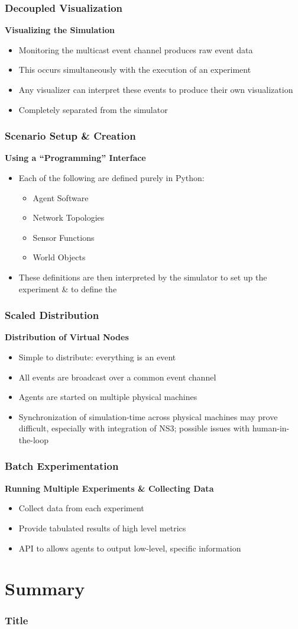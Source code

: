 \documentclass[mathserif]{beamer}
\begin{document}
\frame
{
    \frametitle{Decoupled Visualization}
    \textbf{Visualizing the Simulation}
    \begin{itemize}
        \item Monitoring the multicast event channel produces raw event data
        \item This occurs simultaneously with the execution of an experiment
        \item Any visualizer can interpret these events to produce their own visualization
        \item Completely separated from the simulator
    \end{itemize}
}

\frame
{
    \frametitle{Scenario Setup \& Creation}
    \textbf{Using a ``Programming'' Interface}
    \begin{itemize}
        \item Each of the following are defined purely in Python:
        \begin{itemize}
            \item Agent Software
            \item Network Topologies
            \item Sensor Functions
            \item World Objects
        \end{itemize}
        \item These definitions are then interpreted by the simulator to set up the experiment \& to define the 
    \end{itemize}

}

\frame
{
    \frametitle{Scaled Distribution}
    \textbf{Distribution of Virtual Nodes}
    \begin{itemize}
        \item Simple to distribute: everything is an event
        \item All events are broadcast over a common event channel
        \item Agents are started on multiple physical machines
        \item Synchronization of simulation-time across physical machines may prove difficult, especially with integration of NS3; possible issues with human-in-the-loop
    \end{itemize}
}

\frame
{
    \frametitle{Batch Experimentation}
    \textbf{Running Multiple Experiments \& Collecting Data}
    \begin{itemize}
        \item Collect data from each experiment
        \item Provide tabulated results of high level metrics
        \item API to allows agents to output low-level, specific information
    \end{itemize}
}

\section{Summary}

\frame
{
    \frametitle{Title}
}
\end{document}
